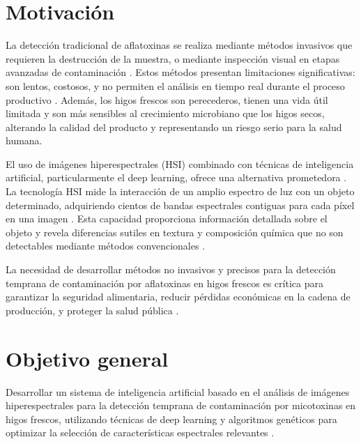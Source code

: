 \section{Motivación}
La detección tradicional de aflatoxinas se realiza mediante métodos invasivos que requieren la destrucción de la muestra, o mediante inspección visual en etapas avanzadas de contaminación \cite{WIEME2022156, agriengineering6040225}. Estos métodos presentan limitaciones significativas: son lentos, costosos, y no permiten el análisis en tiempo real durante el proceso productivo \cite{CISTERNAS2020105626}. Además, los higos frescos son perecederos, tienen una vida útil limitada y son más sensibles al crecimiento microbiano que los higos secos, alterando la calidad del producto y representando un riesgo serio para la salud humana.

\vspace{5mm}

El uso de imágenes hiperespectrales (HSI) combinado con técnicas de inteligencia artificial, particularmente el deep learning, ofrece una alternativa prometedora \cite{PAOLETTI2019279, jimaging5050052, agriengineering6040225}. La tecnología HSI mide la interacción de un amplio espectro de luz con un objeto determinado, adquiriendo cientos de bandas espectrales contiguas para cada píxel en una imagen \cite{KHAN2022101678, article}. Esta capacidad proporciona información detallada sobre el objeto y revela diferencias sutiles en textura y composición química que no son detectables mediante métodos convencionales \cite{WIEME2022156}.

\vspace{5mm}

La necesidad de desarrollar métodos no invasivos y precisos para la detección temprana de contaminación por aflatoxinas en higos frescos es crítica para garantizar la seguridad alimentaria, reducir pérdidas económicas en la cadena de producción, y proteger la salud pública \cite{agriengineering6040225, WIEME2022156}.

\section{Objetivo general}
Desarrollar un sistema de inteligencia artificial basado en el análisis de imágenes hiperespectrales para la detección temprana de contaminación por micotoxinas en higos frescos, utilizando técnicas de deep learning y algoritmos genéticos para optimizar la selección de características espectrales relevantes \cite{PAOLETTI2019279, HONG201935, agriengineering6040225}.

